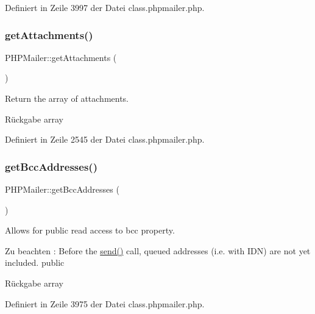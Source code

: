 Definiert in Zeile 3997 der Datei class.\+phpmailer.\+php.

\mbox{\label{class_p_h_p_mailer_a192498fa150cdee1d2f96ad46530ed68}} 
\subsubsection{\texorpdfstring{get\+Attachments()}{getAttachments()}}
{\footnotesize\ttfamily P\+H\+P\+Mailer\+::get\+Attachments (\begin{DoxyParamCaption}{ }\end{DoxyParamCaption})}

Return the array of attachments. \begin{DoxyReturn}{Rückgabe}
array 
\end{DoxyReturn}


Definiert in Zeile 2545 der Datei class.\+phpmailer.\+php.

\mbox{\label{class_p_h_p_mailer_a0a10fbbc813dfe528772bbb1a9240409}} 
\subsubsection{\texorpdfstring{get\+Bcc\+Addresses()}{getBccAddresses()}}
{\footnotesize\ttfamily P\+H\+P\+Mailer\+::get\+Bcc\+Addresses (\begin{DoxyParamCaption}{ }\end{DoxyParamCaption})}

Allows for public read access to \textquotesingle{}bcc\textquotesingle{} property. \begin{DoxyNote}{Zu beachten}
\+: Before the \mbox{\hyperlink{class_p_h_p_mailer_afdd4742f07cfb0bfa7be86ce20468fa3}{send()}} call, queued addresses (i.\+e. with I\+DN) are not yet included.  public 
\end{DoxyNote}
\begin{DoxyReturn}{Rückgabe}
array 
\end{DoxyReturn}


Definiert in Zeile 3975 der Datei class.\+phpmailer.\+php.

\mbox{\label{class_p_h_p_mailer_a855e97313a3b55ab81507ed6d666584f}} 

